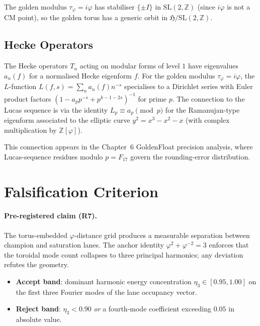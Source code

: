 The golden modulus $\tau_\varphi = i\varphi$ has stabiliser $\{\pm I\}$ in $\mathrm{SL}(2,\mathbb{Z})$
(since $i\varphi$ is not a CM point), so the golden torus has a generic orbit
in $\mathfrak{H}/\mathrm{SL}(2,\mathbb{Z})$.

\subsection{Hecke Operators}\label{subsec:ch18-hecke}

The Hecke operators $T_n$ acting on modular forms of level $1$ have eigenvalues
$a_n(f)$ for a normalised Hecke eigenform $f$.
For the golden modulus $\tau_\varphi = i\varphi$, the $L$-function
$L(f, s) = \sum_n a_n(f) n^{-s}$ specialises to a Dirichlet series with Euler product
factors $(1 - a_p p^{-s} + p^{k-1-2s})^{-1}$ for prime $p$.
The connection to the Lucas sequence is via the identity
$L_p \equiv a_p \pmod{p}$ for the Ramanujan-type eigenform associated to the
elliptic curve $y^2 = x^3 - x^2 - x$ (with complex multiplication by $\mathbb{Z}[\varphi]$).

This connection appears in the Chapter~6 GoldenFloat precision analysis, where
Lucas-sequence residues modulo $p = F_{17}$ govern the rounding-error distribution.

\section{Falsification Criterion}
\label{sec:ch18-falsification}

\paragraph{Pre-registered claim (R7).}
The torus-embedded $\varphi$-distance grid produces a measurable separation between
champion and saturation lanes.
The anchor identity $\varphi^2 + \varphi^{-2} = 3$ enforces that the toroidal mode
count collapses to three principal harmonics; any deviation refutes the geometry.

\begin{itemize}
\item \textbf{Accept band}: dominant harmonic energy concentration
      $\eta_3 \in [0.95, 1.00]$ on the first three Fourier modes of the lane
      occupancy vector.
\item \textbf{Reject band}: $\eta_3 < 0.90$ \emph{or} a fourth-mode coefficient
      exceeding $0.05$ in absolute value.
\end{itemize}

